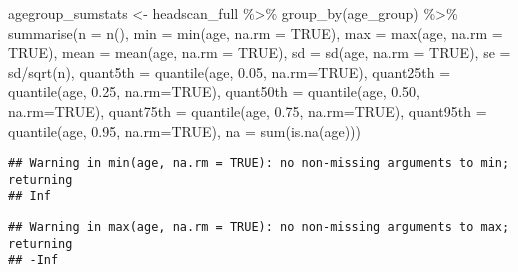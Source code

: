 \documentclass[
]{article}
\newenvironment{Shaded}{\begin{snugshade}}{\end{snugshade}}
\newcommand{\AttributeTok}[1]{\textcolor[rgb]{0.77,0.63,0.00}{#1}}
\newcommand{\ConstantTok}[1]{\textcolor[rgb]{0.00,0.00,0.00}{#1}}
\newcommand{\FloatTok}[1]{\textcolor[rgb]{0.00,0.00,0.81}{#1}}
\newcommand{\FunctionTok}[1]{\textcolor[rgb]{0.00,0.00,0.00}{#1}}
\newcommand{\NormalTok}[1]{#1}
\newcommand{\OtherTok}[1]{\textcolor[rgb]{0.56,0.35,0.01}{#1}}
\newcommand{\SpecialCharTok}[1]{\textcolor[rgb]{0.00,0.00,0.00}{#1}}
\begin{document}
\begin{Shaded}
\begin{Highlighting}[]
\NormalTok{agegroup\_sumstats }\OtherTok{\textless{}{-}}\NormalTok{ headscan\_full }\SpecialCharTok{\%\textgreater{}\%} 
  \FunctionTok{group\_by}\NormalTok{(age\_group) }\SpecialCharTok{\%\textgreater{}\%} 
  \FunctionTok{summarise}\NormalTok{(}\AttributeTok{n =} \FunctionTok{n}\NormalTok{(),}
            \AttributeTok{min =} \FunctionTok{min}\NormalTok{(age, }\AttributeTok{na.rm =} \ConstantTok{TRUE}\NormalTok{),}
            \AttributeTok{max =} \FunctionTok{max}\NormalTok{(age, }\AttributeTok{na.rm =} \ConstantTok{TRUE}\NormalTok{),}
            \AttributeTok{mean =} \FunctionTok{mean}\NormalTok{(age, }\AttributeTok{na.rm =} \ConstantTok{TRUE}\NormalTok{),}
            \AttributeTok{sd =} \FunctionTok{sd}\NormalTok{(age, }\AttributeTok{na.rm =} \ConstantTok{TRUE}\NormalTok{),}
            \AttributeTok{se =}\NormalTok{ sd}\SpecialCharTok{/}\FunctionTok{sqrt}\NormalTok{(n),}
            \AttributeTok{quant5th =} \FunctionTok{quantile}\NormalTok{(age, }\FloatTok{0.05}\NormalTok{, }\AttributeTok{na.rm=}\ConstantTok{TRUE}\NormalTok{),}
            \AttributeTok{quant25th =} \FunctionTok{quantile}\NormalTok{(age, }\FloatTok{0.25}\NormalTok{, }\AttributeTok{na.rm=}\ConstantTok{TRUE}\NormalTok{),}
            \AttributeTok{quant50th =} \FunctionTok{quantile}\NormalTok{(age, }\FloatTok{0.50}\NormalTok{, }\AttributeTok{na.rm=}\ConstantTok{TRUE}\NormalTok{),}
            \AttributeTok{quant75th =} \FunctionTok{quantile}\NormalTok{(age, }\FloatTok{0.75}\NormalTok{, }\AttributeTok{na.rm=}\ConstantTok{TRUE}\NormalTok{),}
            \AttributeTok{quant95th =} \FunctionTok{quantile}\NormalTok{(age, }\FloatTok{0.95}\NormalTok{, }\AttributeTok{na.rm=}\ConstantTok{TRUE}\NormalTok{),}
            \AttributeTok{na =} \FunctionTok{sum}\NormalTok{(}\FunctionTok{is.na}\NormalTok{(age)))}
\end{Highlighting}
\end{Shaded}

\begin{verbatim}
## Warning in min(age, na.rm = TRUE): no non-missing arguments to min; returning
## Inf
\end{verbatim}

\begin{verbatim}
## Warning in max(age, na.rm = TRUE): no non-missing arguments to max; returning
## -Inf
\end{verbatim}
\end{document}
